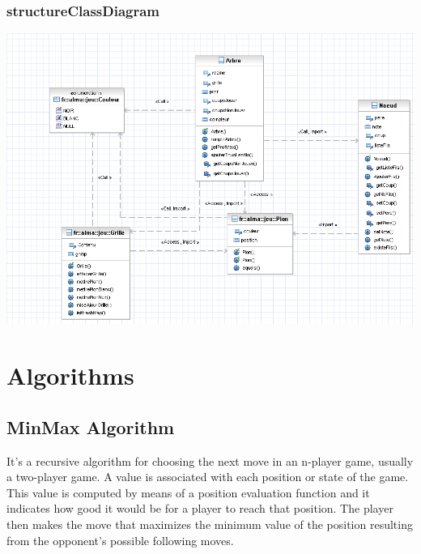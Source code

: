 \documentclass{report}
\begin{document}
\subsection*{structureClassDiagram}
\begin{center}
\includegraphics[scale=0.50]{images/fralmastructureClassDiagram}
\end{center}







\chapter{Algorithms}

\section{MinMax Algorithm }

It's a recursive algorithm for choosing the next move in an n-player game, usually a two-player game. A value is associated with each position or state of the game. This value is computed by means of a position evaluation function and it indicates how good it would be for a player to reach that position. The player then makes the move that maximizes the minimum value of the position resulting from the opponent's possible following moves.\\
\end{document}
